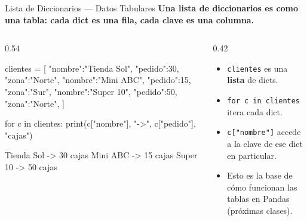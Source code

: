 \documentclass[aspectratio=169, 11pt]{beamer}
\begin{document}
\begin{frame}[fragile,shrink=30]{Lista de Diccionarios --- Datos Tabulares}
  \vspace{-6pt}
  {\small\color{arcaDark}\bfseries
    Una lista de diccionarios es como una tabla:
    cada dict es una fila, cada clave es una columna.}

  \vspace{4pt}
  \begin{columns}[T]
    \begin{column}{0.54\textwidth}
      \begin{pyblock}
clientes = [
  {"nombre":"Tienda Sol", "pedido":30,
   "zona":"Norte"},
  {"nombre":"Mini ABC",   "pedido":15,
   "zona":"Sur"},
  {"nombre":"Super 10",   "pedido":50,
   "zona":"Norte"},
]

for c in clientes:
    print(c["nombre"], "->",
          c["pedido"], "cajas")
      \end{pyblock}
      \vspace{-2pt}
      \begin{outputblock}
Tienda Sol -> 30 cajas
Mini ABC -> 15 cajas
Super 10 -> 50 cajas
      \end{outputblock}
    \end{column}

    \begin{column}{0.42\textwidth}
      \vspace{2pt}
      {\scriptsize\color{textMuted}
      \begin{itemize}\setlength{\itemsep}{4pt}
        \item[{\color{arcaRed}\scriptsize\faArrowRight}]
          \texttt{clientes} es una \textbf{lista} de dicts.
        \item[{\color{arcaRed}\scriptsize\faArrowRight}]
          \texttt{for c in clientes} itera cada dict.
        \item[{\color{arcaRed}\scriptsize\faArrowRight}]
          \texttt{c["nombre"]} accede a la clave
          de ese dict en particular.
        \item[{\color{arcaRed}\scriptsize\faLightbulb}]
          Esto es la base de cómo funcionan
          las tablas en Pandas (próximas clases).
      \end{itemize}
      }
    \end{column}
  \end{columns}
\end{frame}
\end{document}
